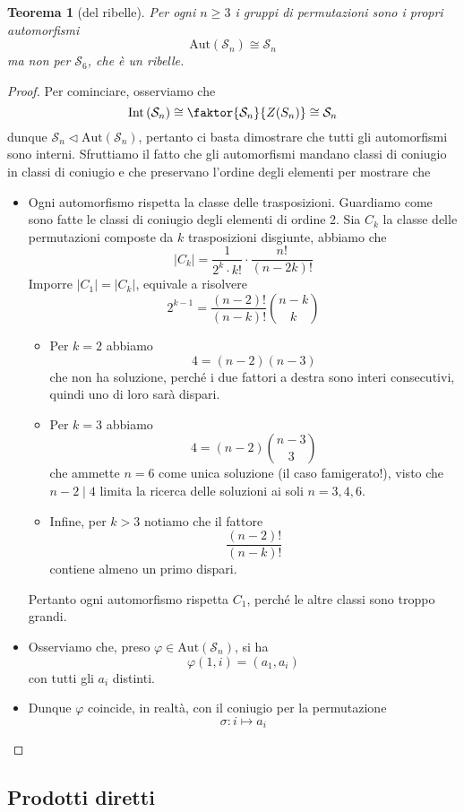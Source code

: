 \documentclass[a4paper]{article}
\newtheorem{theorem}{Teorema}[section]
\theoremstyle{remark}
\theoremstyle{definition}
\newcommand{\Aut}[1]{\mathrm{Aut}\left( #1 \right)}
\newcommand{\Int}[1]{\mathrm{Int}\left( #1 \right)}
\renewcommand{\S}{\mathcal{S}}
\begin{document}
\begin{multicols}{2}
\begin{theorem}[del ribelle]
	Per ogni $ n \geq 3 $ i gruppi di permutazioni sono i propri automorfismi $$  \Aut{\S_n} \cong \S_n  $$ ma non per $ \S_6 $, che è un ribelle.
\end{theorem}
\begin{proof}
	Per cominciare, osserviamo che
	\[ \Int{\S_n} \cong \faktor{\S_n}{Z(S_n)} \cong \S_n \]
	dunque $ \S_n \lhd \Aut{\S_n} $, pertanto ci basta dimostrare che tutti gli automorfismi sono interni. Sfruttiamo il fatto che gli automorfismi mandano classi di coniugio in classi di coniugio e che preservano l'ordine degli elementi per mostrare che
	\begin{itemize}
		\item  Ogni automorfismo rispetta la classe delle trasposizioni. Guardiamo come sono fatte le classi di coniugio degli elementi di ordine 2. Sia $ C_k $ la classe delle permutazioni composte da $ k $ trasposizioni disgiunte, abbiamo che
		\[ |C_k|  = \frac{1}{2^k \cdot k!}\cdot \frac{n!}{(n-2k)!} \]
		Imporre $ |C_1| = |C_k| $, equivale a risolvere
		\[ 2^{k-1} = \frac{(n-2)!}{(n-k)!}{n-k \choose k } \]
		\begin{itemize}
			\item Per $ \boxed{k = 2} $ abbiamo
			\[ 4 = (n-2)(n-3) \]
			che non ha soluzione, perché i due fattori a destra sono interi consecutivi, quindi uno di loro sarà dispari.
			\item Per $ \boxed{k = 3} $ abbiamo
			\[ 4 = (n-2) {n-3 \choose 3} \]
			che ammette $ n = 6 $ come unica soluzione (il caso famigerato!), visto che $ n-2 \mid 4 $ limita la ricerca delle soluzioni ai soli $ n = 3, 4, 6 $.
			\item Infine, per $ \boxed{k > 3} $ notiamo che il fattore 
			\[ \frac{(n-2)!}{(n-k)!} \]
			contiene almeno un primo dispari.
		\end{itemize}
		Pertanto ogni automorfismo rispetta $ C_1 $, perché le altre classi sono troppo grandi. 
		\item Osserviamo che, preso $ \varphi \in \Aut{\S_n} $, si ha
		$$  \varphi(1, i) = (a_1, a_i)  $$
		con tutti gli $ a_i $ distinti.
		\item Dunque $ \varphi $ coincide, in realtà, con il coniugio per la permutazione
		$$  \sigma : i \mapsto a_i  $$
	\end{itemize}
\end{proof}

\end{multicols}
\subsection{Prodotti diretti}
\end{document}
